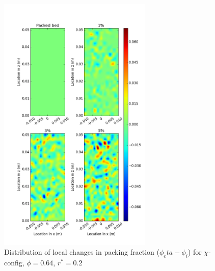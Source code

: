 \begin{figure}[!t]
    \centering
    \includegraphics[width = 0.65\textwidth]{figures/x-62-r125-1-deltas.png}
    \caption{Distribution of local changes in packing fraction ($\phi_eta - \phi_i$) for $\chi$-config, $\phi = 0.64$, $r^* = 0.2$}\label{fig:x-624-r125-deltas}
\end{figure}



